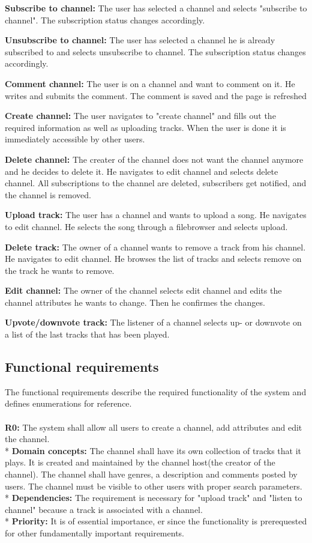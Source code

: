 \documentclass[a4paper,11pt,report]{article}
\begin{document}
\textbf{Subscribe to channel:}
The user has selected a channel and selects "subscribe to channel". The subscription status changes accordingly.

\textbf{Unsubscribe to channel:}
The user has selected a channel he is already subscribed to and selects unsubscribe to channel. The subscription status changes accordingly.

\textbf{Comment channel:}
The user is on a channel and want to comment on it. He writes and submits the comment. The comment is saved and the page is refreshed

\textbf{Create channel:}
The user navigates to "create channel" and fills out the required information as well as uploading tracks. When the user is done it is immediately accessible by other users.

\textbf{Delete channel:}
The creater of the channel does not want the channel anymore and he decides to delete it. He navigates to edit channel and selects delete channel. All subscriptions to the channel are deleted, subscribers get notified, and the channel is removed.

\textbf{Upload track:}
The user has a channel and wants to upload a song. He navigates to edit channel. He selects the song through a filebrowser and selects upload.

\textbf{Delete track:}
The owner of a channel wants to remove a track from his channel. He navigates to edit channel. He browses the list of tracks and selects remove on the track he wants to remove.

\textbf{Edit channel:}
The owner of the channel selects edit channel and edits the channel attributes he wants to change. Then he confirmes the changes.

\textbf{Upvote/downvote track:}
The listener of a channel selects up- or downvote on a list of the last tracks that has been played.

\subsection{Functional requirements}
The functional requirements describe the required functionality of the system and defines enumerations for reference.
\\ \\
\textbf{R0:}
The system shall allow all users to create a channel, add attributes and edit the channel. \\*
\textbf{Domain concepts:}
The channel shall have its own collection of tracks that it plays. It is created and maintained by the channel host(the creator of the channel).
The channel shall have genres, a description and comments posted by users.
The channel must be visible to other users with proper search parameters. \\*
\textbf{Dependencies:} 
The requirement is necessary for "upload track" and "listen to channel" because a track is associated with a channel. \\*
\textbf{Priority:} 
It is of essential importance, er since the functionality is prerequested for other fundamentally important requirements.
\\ \\
\end{document}
